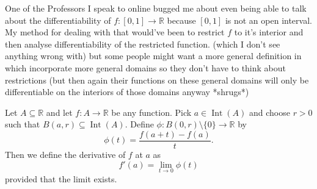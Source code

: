 	One of the Professors I speak to online bugged me about even being able to talk  about the differentiability of $f : [0, 1] \to \mathbb{R}$ because $[0, 1]$ is not an open interval. My method for dealing with that would've been to restrict $f$ to it's interior and then analyse differentiability of the restricted function. (which I don't see anything wrong with) but some people might want a more general definition in which incorporate more general domains so they don't have to think about restrictions (but then again their functions on these general domains will only be differentiable on the interiors of those domains anyway *shrugs*)
	
	
	\begin{definition}
		Let $A \subseteq \mathbb{R}$ and let $f : A \to \mathbb{R}$ be any function. Pick $a \in \operatorname{Int}(A)$ and choose $r > 0$ such that $B(a, r) \subseteq \operatorname{Int}(A)$. Define $\phi : B(0, r) \setminus \{0\} \to \mathbb{R}$ by $$\phi(t) = \frac{f(a+t) - f(a)}{t}.$$ Then we define the derivative of $f$ at $a$ as $$f'(a) = \lim_{t \to 0} \phi(t)$$ provided that the limit exists.
	\end{definition}